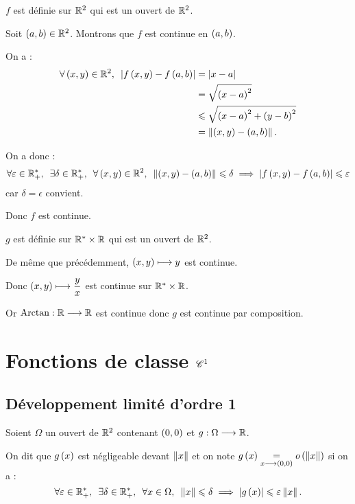 \begin{corr}
\(f\) est définie sur \(\mathbb{R}^2\) qui est un ouvert de \(\mathbb{R}^2\).

Soit \(\left(a,b\right)\in\mathbb{R}^2\). Montrons que \(f\) est continue en \(\left(a,b\right)\).

On a : \[\begin{aligned}
\quantifs{\forall\paren{x,y}\in\R^2}\abs{f\paren{x,y}-f\paren{a,b}}&=\abs{x-a} \\
&=\sqrt{\paren{x-a}^2} \\
&\leq\sqrt{\paren{x-a}^2+\paren{y-b}^2} \\
&=\norme{\paren{x,y}-\paren{a,b}}.
\end{aligned}\]

On a donc : \[\quantifs{\forall\epsilon\in\Rps;\exists\delta\in\Rps;\forall\paren{x,y}\in\R^2}\norme{\paren{x,y}-\paren{a,b}}\leq\delta\imp\abs{f\paren{x,y}-f\paren{a,b}}\leq\epsilon\] car \(\delta=\epsilon\) convient.

Donc \(f\) est continue.

\(g\) est définie sur \(\mathbb{R}^*\times\mathbb{R}\) qui est un ouvert de \(\mathbb{R}^2\).

De même que précédemment, \(\left(x,y\right)\longmapsto y\) est continue.

Donc \(\left(x,y\right)\longmapsto\dfrac{y}{x}\) est continue sur \(\mathbb{R}^*\times\mathbb{R}\).

Or \(\operatorname{Arctan}:\mathbb{R}\longrightarrow\mathbb{R}\) est continue donc \(g\) est continue par composition.
\end{corr}

\section{Fonctions de classe \(\mathscr{C}^{1}\)}

\subsection{Développement limité d'ordre 1}

\begin{nota}
Soient \(\Omega\) un ouvert de \(\mathbb{R}^2\) contenant \(\left(0,0\right)\) et \(g:\Omega\longrightarrow\mathbb{R}\).

On dit que \(g\left(x\right)\) est négligeable devant \(\left\|x\right\|\) et on note \(g\left(x\right)\underset{x\longrightarrow\left(0,0\right)}{=}o\left(\left\|x\right\|\right)\) si on a : \[\quantifs{\forall\epsilon\in\Rps;\exists\delta\in\Rps;\forall x\in\Omega}\norme{x}\leq\delta\imp\abs{g\paren{x}}\leq\epsilon\norme{x}.\]
\end{nota}

